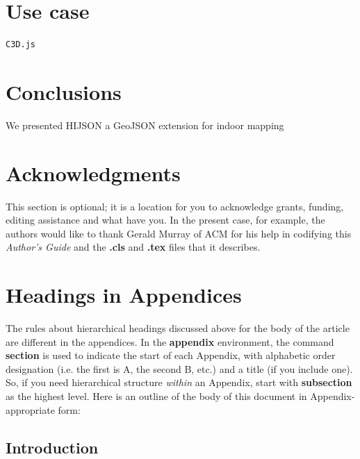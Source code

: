 \documentclass{sig-alternate}
\begin{document}
\section{Use case}\label{use-case}

\begin{verbatim}
C3D.js
\end{verbatim}

\section{Conclusions}\label{conclusions}

We presented HIJSON a GeoJSON extension for indoor mapping

\section{Acknowledgments}
This section is optional; it is a location for you
to acknowledge grants, funding, editing assistance and
what have you.  In the present case, for example, the
authors would like to thank Gerald Murray of ACM for
his help in codifying this \emph{Author's Guide}
and the \textbf{.cls} and \textbf{.tex} files that it describes.

%

%
%
\appendix
\section{Headings in Appendices}
The rules about hierarchical headings discussed above for
the body of the article are different in the appendices.
In the \textbf{appendix} environment, the command
\textbf{section} is used to
indicate the start of each Appendix, with alphabetic order
designation (i.e. the first is A, the second B, etc.) and
a title (if you include one).  So, if you need
hierarchical structure
\emph{within} an Appendix, start with \textbf{subsection} as the
highest level. Here is an outline of the body of this
document in Appendix-appropriate form:
\subsection{Introduction}
\end{document}
